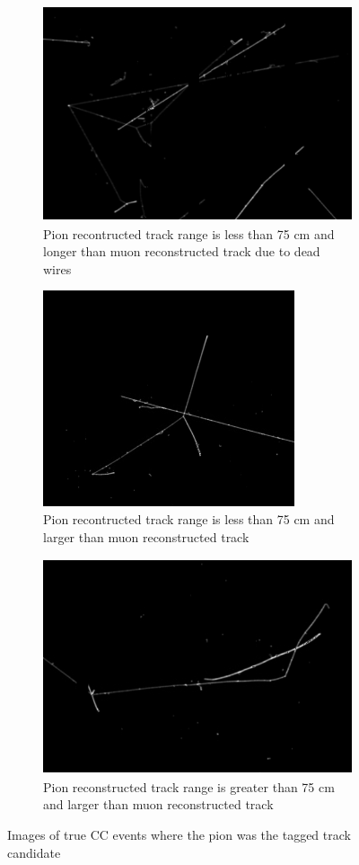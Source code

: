 \begin{figure}[htp!]
\centering
	\begin{subfigure}[b]{.3\textwidth}
	\includegraphics[width=\textwidth,height=2.5in]{figs/interesting_event.png}
	\caption{Pion recontructed track range is less than 75 cm and longer than muon reconstructed track due to dead wires}
	\label{fig:longer_muon_badreco}
	\end{subfigure}
	\quad
	\begin{subfigure}[b]{.3\textwidth}
	\includegraphics[width=\textwidth,height=2.5in]{figs/event2.png}
	\caption{Pion recontructed track range is less than 75 cm and larger than muon reconstructed track}
	\label{fig:longer_pion}
	\end{subfigure}
	\quad
	\begin{subfigure}[b]{.3\textwidth}
	\includegraphics[width=\textwidth,height=2.5in]{figs/mupievent.png}
	\caption{Pion reconstructed track range is greater than 75 cm and larger than muon reconstructed track}
	\label{fig:verylongpion}
	\end{subfigure}
	\quad
\caption{Images of true CC events where the pion was the tagged track candidate}
\label{fig:evd}
\end{figure}

